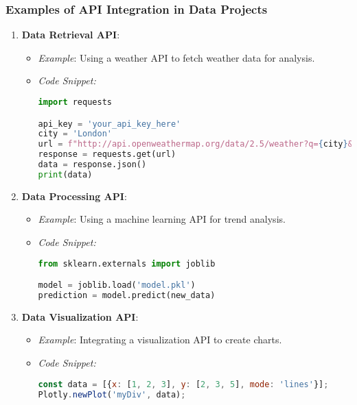 \documentclass[aspectratio=169]{beamer}
\begin{document}
\begin{frame}[fragile]
    \frametitle{Examples of API Integration in Data Projects}
    \begin{enumerate}
        \item \textbf{Data Retrieval API}:
        \begin{itemize}
            \item \textit{Example}: Using a weather API to fetch weather data for analysis.
            \item \textit{Code Snippet:}
            \begin{lstlisting}[language=Python]
import requests

api_key = 'your_api_key_here'
city = 'London'
url = f"http://api.openweathermap.org/data/2.5/weather?q={city}&appid={api_key}"
response = requests.get(url)
data = response.json()
print(data)
            \end{lstlisting}
        \end{itemize}

        \item \textbf{Data Processing API}:
        \begin{itemize}
            \item \textit{Example}: Using a machine learning API for trend analysis.
            \item \textit{Code Snippet:}
            \begin{lstlisting}[language=Python]
from sklearn.externals import joblib

model = joblib.load('model.pkl')
prediction = model.predict(new_data)
            \end{lstlisting}
        \end{itemize}

        \item \textbf{Data Visualization API}:
        \begin{itemize}
            \item \textit{Example}: Integrating a visualization API to create charts.
            \item \textit{Code Snippet:}
            \begin{lstlisting}[language=JavaScript]
const data = [{x: [1, 2, 3], y: [2, 3, 5], mode: 'lines'}];
Plotly.newPlot('myDiv', data);
            \end{lstlisting}
        \end{itemize}
    \end{enumerate}
\end{frame}
\end{document}

